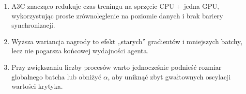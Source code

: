 \documentclass[12pt,a4paper]{article}
\begin{document}
\begin{enumerate}
  \item A3C znacząco redukuje czas treningu na sprzęcie CPU + jedna GPU,
        wykorzystując proste zrównoleglenie na poziomie danych
        i brak bariery synchronizacji.
  \item Wyższa wariancja nagrody to efekt
        „starych” gradientów i mniejszych batchy,
        lecz nie pogarsza końcowej wydajności agenta.
  \item Przy zwiększaniu liczby procesów
        warto jednocześnie podnieść rozmiar globalnego batcha
        lub obniżyć \(\alpha\), aby uniknąć zbyt gwałtownych
        oscylacji wartości krytyka.
\end{enumerate}


\end{document}
